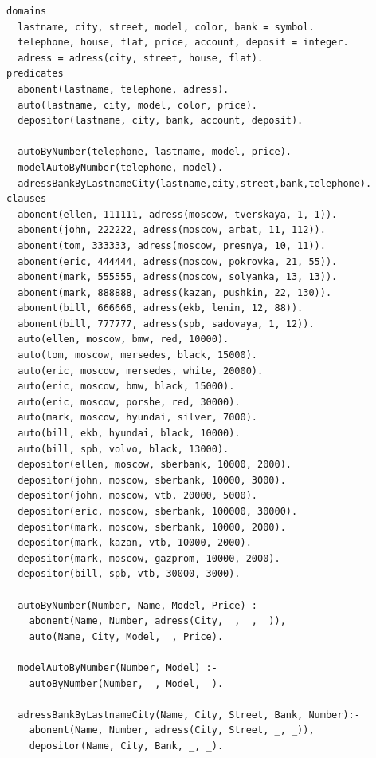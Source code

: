 \documentclass[a4paper,14pt]{extreport} %
\begin{document}
\begin{lstlisting}
domains
  lastname, city, street, model, color, bank = symbol.
  telephone, house, flat, price, account, deposit = integer.
  adress = adress(city, street, house, flat).
predicates
  abonent(lastname, telephone, adress).
  auto(lastname, city, model, color, price).
  depositor(lastname, city, bank, account, deposit).
  
  autoByNumber(telephone, lastname, model, price).
  modelAutoByNumber(telephone, model).
  adressBankByLastnameCity(lastname,city,street,bank,telephone).
clauses
  abonent(ellen, 111111, adress(moscow, tverskaya, 1, 1)).
  abonent(john, 222222, adress(moscow, arbat, 11, 112)).
  abonent(tom, 333333, adress(moscow, presnya, 10, 11)).
  abonent(eric, 444444, adress(moscow, pokrovka, 21, 55)).
  abonent(mark, 555555, adress(moscow, solyanka, 13, 13)).
  abonent(mark, 888888, adress(kazan, pushkin, 22, 130)).
  abonent(bill, 666666, adress(ekb, lenin, 12, 88)).
  abonent(bill, 777777, adress(spb, sadovaya, 1, 12)).
  auto(ellen, moscow, bmw, red, 10000).
  auto(tom, moscow, mersedes, black, 15000).
  auto(eric, moscow, mersedes, white, 20000).
  auto(eric, moscow, bmw, black, 15000).
  auto(eric, moscow, porshe, red, 30000).
  auto(mark, moscow, hyundai, silver, 7000).
  auto(bill, ekb, hyundai, black, 10000).
  auto(bill, spb, volvo, black, 13000).
  depositor(ellen, moscow, sberbank, 10000, 2000).
  depositor(john, moscow, sberbank, 10000, 3000).
  depositor(john, moscow, vtb, 20000, 5000).
  depositor(eric, moscow, sberbank, 100000, 30000).
  depositor(mark, moscow, sberbank, 10000, 2000).
  depositor(mark, kazan, vtb, 10000, 2000).
  depositor(mark, moscow, gazprom, 10000, 2000).
  depositor(bill, spb, vtb, 30000, 3000).
  
  autoByNumber(Number, Name, Model, Price) :- 
    abonent(Name, Number, adress(City, _, _, _)),
    auto(Name, City, Model, _, Price).
    
  modelAutoByNumber(Number, Model) :-
    autoByNumber(Number, _, Model, _).
    
  adressBankByLastnameCity(Name, City, Street, Bank, Number):-
    abonent(Name, Number, adress(City, Street, _, _)),
    depositor(Name, City, Bank, _, _).
\end{lstlisting}
\end{document}
